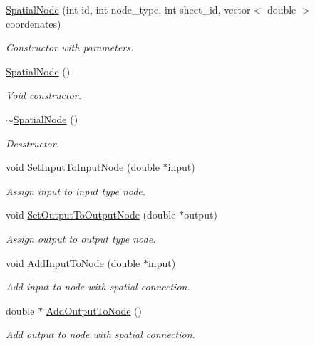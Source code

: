 \begin{DoxyCompactItemize}
\item 
\hyperlink{class_a_n_n___u_s_m_1_1_spatial_node_a850a0daf46db5285b1e8040290b07674}{Spatial\-Node} (int id, int node\-\_\-type, int sheet\-\_\-id, vector$<$ double $>$ coordenates)
\begin{DoxyCompactList}\small\item\em Constructor with parameters. \end{DoxyCompactList}\item 
\hyperlink{class_a_n_n___u_s_m_1_1_spatial_node_ae336eca0b93593037e499d294d0ad1e9}{Spatial\-Node} ()
\begin{DoxyCompactList}\small\item\em Void constructor. \end{DoxyCompactList}\item 
\hyperlink{class_a_n_n___u_s_m_1_1_spatial_node_abc168ab9247fe8de51cae8fa20ed426f}{$\sim$\-Spatial\-Node} ()
\begin{DoxyCompactList}\small\item\em Desstructor. \end{DoxyCompactList}\item 
void \hyperlink{class_a_n_n___u_s_m_1_1_spatial_node_a766657c75494a2b8a63efa490cd69731}{Set\-Input\-To\-Input\-Node} (double $\ast$input)
\begin{DoxyCompactList}\small\item\em Assign input to input type node. \end{DoxyCompactList}\item 
void \hyperlink{class_a_n_n___u_s_m_1_1_spatial_node_af35108c8493e1d07417cca24647472d2}{Set\-Output\-To\-Output\-Node} (double $\ast$output)
\begin{DoxyCompactList}\small\item\em Assign output to output type node. \end{DoxyCompactList}\item 
void \hyperlink{class_a_n_n___u_s_m_1_1_spatial_node_ae994e1f4b678210c67158bec7c43225f}{Add\-Input\-To\-Node} (double $\ast$input)
\begin{DoxyCompactList}\small\item\em Add input to node with spatial connection. \end{DoxyCompactList}\item 
double $\ast$ \hyperlink{class_a_n_n___u_s_m_1_1_spatial_node_a17635297f3f9938e59c914759eff1e38}{Add\-Output\-To\-Node} ()
\begin{DoxyCompactList}\small\item\em Add output to node with spatial connection. \end{DoxyCompactList}\item 

\end{DoxyCompactItemize}
